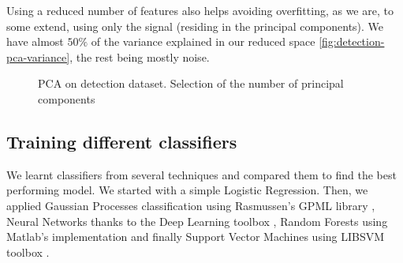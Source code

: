 \documentclass[10pt,a4paper]{article}
\begin{document}
  Using a reduced number of features also helps avoiding overfitting, as we are, to some extend, using only the signal (residing in the principal components). We have almost $50\%$ of the variance explained in our reduced space \ref{fig:detection-pca-variance}, the rest being mostly noise.

   \begin{figure}[ht]
       \center
    	\hfill
	\caption{PCA on detection dataset. Selection of the number of principal components}
  \end{figure}

  \subsection{Training different classifiers}
  We learnt classifiers from several techniques and compared them to find the best performing model. We started with a simple Logistic Regression. Then, we applied Gaussian Processes classification using Rasmussen's GPML library \cite{gpmltoolbox},  Neural Networks thanks to the Deep Learning toolbox \cite{deeplearningtoolbox}, Random Forests using Matlab's implementation and finally Support Vector Machines using LIBSVM toolbox \cite{libsvmtoolbox}.\\
\end{document}
